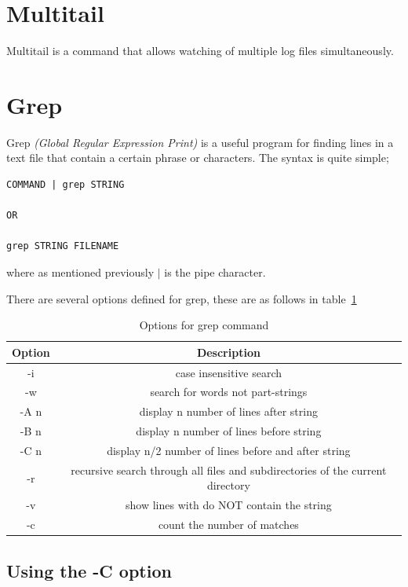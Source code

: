 \section{Multitail}
\label{sec:multitail}

Multitail is a command that allows watching of multiple log files simultaneously.


\section{Grep}
\label{sec:grep}

Grep \textit{(Global Regular Expression Print)} is a useful program for finding lines in a text file that contain a certain phrase or characters.  The syntax is quite simple;

\begin{lstlisting}
COMMAND | grep STRING

OR

grep STRING FILENAME
\end{lstlisting}

where as mentioned previously $|$ is the pipe character.

There are several options defined for grep, these are as follows in table~\ref{tab:grep}

\begin{table}[!th]
\centering
\begin{tabular}{cc}
\hline
Option & Description\\
\hline
-i & case insensitive search\\
-w & search for words not part-strings\\
-A n & display n number of lines after string\\
-B n & display n number of lines before string\\
-C n & display n/2 number of lines before and after string\\
-r & recursive search through all files and subdirectories of the current directory\\
-v & show lines with do NOT contain the string\\
-c & count the number of matches\\
\hline
\end{tabular}
\caption{Options for grep command}
\label{tab:grep}
\end{table}

\subsection{Using the -C option}

